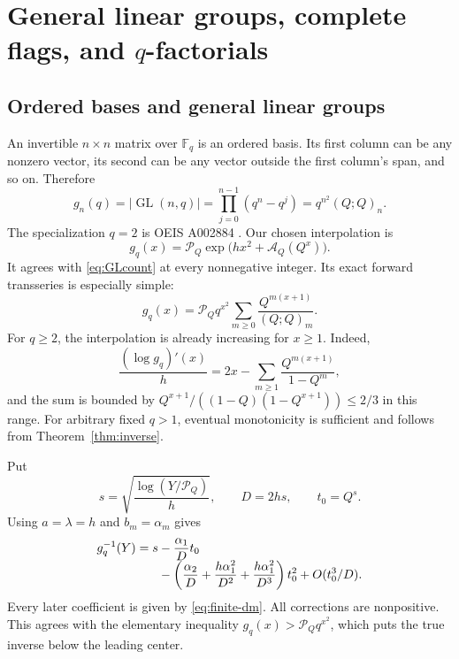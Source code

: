 \documentclass[11pt]{article}
\numberwithin{equation}{section}
\theoremstyle{definition}
\newcommand{\F}{\mathbb F}
\newcommand{\GL}{\operatorname{GL}}
\newcommand{\pp}[1]{(Q;Q)_{#1}}
\newcommand{\Pinf}{\mathcal P_Q}
\newcommand{\A}{\mathcal A_Q}
\begin{document}
\section{General linear groups, complete flags, and \texorpdfstring{$q$}{q}-factorials}
\label{sec:GL}

\subsection{Ordered bases and general linear groups}

An invertible $n\times n$ matrix over $\F_q$ is an ordered basis. Its first column can be any nonzero vector, its second can be any vector outside the first column's span, and so on. Therefore
\begin{equation}\label{eq:GLcount}
 g_n(q)=|\GL(n,q)|=\prod_{j=0}^{n-1}(q^n-q^j)
       =q^{n^2}\pp{n}.
\end{equation}
The specialization $q=2$ is OEIS A002884 \cite{oeisGL}. Our chosen interpolation is
\begin{equation}\label{eq:GLinterp}
 g_q(x)=\Pinf\exp\bigl(hx^2+\A(Q^x)\bigr).
\end{equation}
It agrees with \eqref{eq:GLcount} at every nonnegative integer. Its exact forward transseries is especially simple:
\begin{equation}\label{eq:GLforward}
 g_q(x)=\Pinf q^{x^2}
       \sum_{m\ge0}\frac{Q^{m(x+1)}}{\pp{m}}.
\end{equation}
For $q\ge2$, the interpolation is already increasing for $x\ge1$. Indeed,
\[
 \frac{(\log g_q)'(x)}h
 =2x-\sum_{m\ge1}\frac{Q^{m(x+1)}}{1-Q^m},
\]
and the sum is bounded by
$Q^{x+1}/((1-Q)(1-Q^{x+1}))\le2/3$ in this range.
For arbitrary fixed $q>1$, eventual monotonicity is sufficient and follows from Theorem~\ref{thm:inverse}.

Put
\begin{equation}\label{eq:GLcenter}
 s=\sqrt{\frac{\log(Y/\Pinf)}h},\qquad D=2hs,\qquad t_0=Q^s.
\end{equation}
Using $a=\lambda=h$ and $b_m=\alpha_m$ gives
\begin{align}\label{eq:GLinverse}
 g_q^{-1}(Y)=s
 &-\frac{\alpha_1}{D}t_0\\[-0.4em]
 &-\left(\frac{\alpha_2}{D}
       +\frac{h\alpha_1^2}{D^2}
       +\frac{h\alpha_1^2}{D^3}\right)t_0^2
 +O(t_0^3/D).\notag
\end{align}
Every later coefficient is given by \eqref{eq:finite-dm}. All corrections are nonpositive. This agrees with the elementary inequality
$g_q(x)>\Pinf q^{x^2}$, which puts the true inverse below the leading center.
\end{document}

